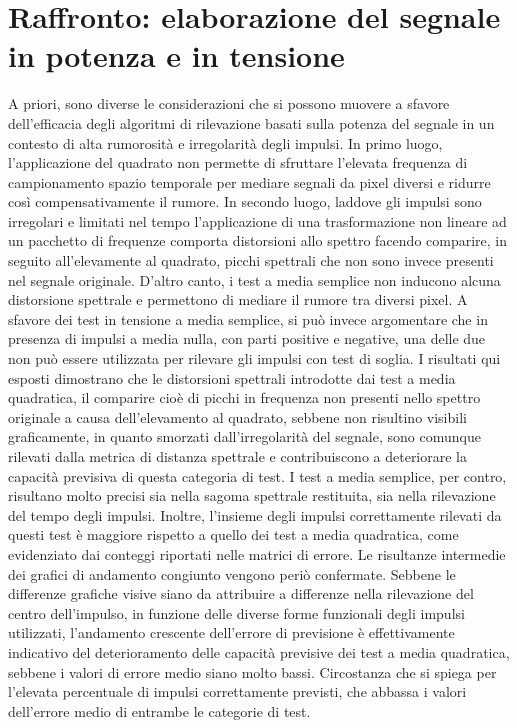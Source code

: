 \section{Raffronto: elaborazione del segnale in potenza e in tensione}
A priori, sono diverse le considerazioni che si possono muovere a sfavore dell'efficacia degli algoritmi di rilevazione basati sulla potenza del segnale in un contesto di alta rumorosità e irregolarità degli impulsi. In primo luogo, l'applicazione del quadrato non permette di sfruttare l'elevata frequenza di campionamento spazio temporale per mediare segnali da pixel diversi e ridurre così compensativamente il rumore. In secondo luogo, laddove gli impulsi sono irregolari e limitati nel tempo l'applicazione di una trasformazione non lineare ad un pacchetto di frequenze comporta distorsioni allo spettro facendo comparire, in seguito all'elevamente al quadrato, picchi spettrali che non sono invece presenti nel segnale originale. D'altro canto, i test a media semplice non inducono alcuna distorsione spettrale e permettono di mediare il rumore tra diversi pixel. A sfavore dei test in tensione a media semplice, si può invece argomentare che in presenza di impulsi a media nulla, con parti positive e negative, una delle due non può essere utilizzata per rilevare gli impulsi con test di soglia.
%
I risultati qui esposti dimostrano che le distorsioni spettrali introdotte dai test a media quadratica, il comparire cioè di picchi in frequenza non presenti nello spettro originale a causa dell'elevamento al quadrato, sebbene non risultino visibili graficamente, in quanto smorzati dall'irregolarità del segnale, sono comunque rilevati dalla metrica di distanza spettrale e contribuiscono a deteriorare la capacità previsiva di questa categoria di test.
%
I test a media semplice, per contro, risultano molto precisi sia nella sagoma spettrale restituita, sia nella rilevazione del tempo degli impulsi. Inoltre, l'insieme degli impulsi correttamente rilevati da questi test è maggiore rispetto a quello dei test a media quadratica, come evidenziato dai conteggi riportati nelle matrici di errore.
%
Le risultanze intermedie dei grafici di andamento congiunto vengono periò confermate. Sebbene le differenze grafiche visive siano da attribuire a differenze nella rilevazione del centro dell'impulso, in funzione delle diverse forme funzionali degli impulsi utilizzati, l'andamento crescente dell'errore di previsione è effettivamente indicativo del deterioramento delle capacità previsive dei test a media quadratica, sebbene i valori di errore medio siano molto bassi. Circostanza che si spiega per l'elevata percentuale di impulsi correttamente previsti, che abbassa i valori dell'errore medio di entrambe le categorie di test.



